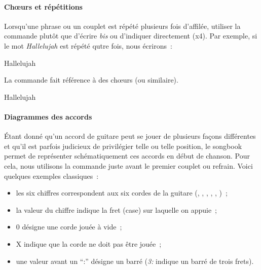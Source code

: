 \paragraph{Ch\oe{}urs et répétitions}
Lorsqu'une phrase ou un couplet est répété plusieurs fois d'affilée,
utiliser la commande  plutôt que d'écrire \emph{bis} ou
d'indiquer directement (x4). Par exemple, si le mot \emph{Hallelujah}
est répété qutre fois, nous écrirons~:

\begin{songbook}
Hallelujah 
\end{songbook}

La commande  fait référence à des chœurs (ou
similaire).

\begin{songbook}
Hallelujah 
\end{songbook}

\paragraph{Diagrammes des accords}
Étant donné qu'un accord de guitare peut se jouer de plusieurs façons
différentes et qu'il est parfois judicieux de privilégier telle ou
telle position, le songbook permet de représenter schématiquement ces
accords en début de chanson. Pour cela, nous utilisons la commande
 juste avant le premier couplet ou refrain. Voici
quelques exemples classiques~:

\begin{songbook}
\end{songbook}

\begin{itemize}
\item les six chiffres correspondent aux six cordes de la guitare
  (, , , ,
  , )~;
\item la valeur du chiffre indique la fret (case) sur laquelle on
  appuie~;
\item 0 désigne une corde jouée à vide~;
\item X indique que la corde ne doit pas être jouée~;
\item une valeur avant un ``:'' désigne un barré (\emph{3:} indique un
  barré de trois frets).
\end{itemize}

